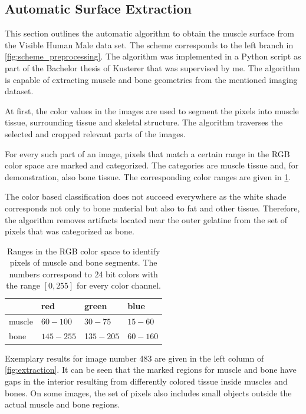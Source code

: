 \subsection{Automatic Surface Extraction}
This section outlines the automatic algorithm to obtain the muscle surface from the Visible Human Male data set. The scheme corresponds to the left branch in \cref{fig:scheme_preprocessing}. The algorithm was implemented in a Python script as part of the Bachelor thesis of Kusterer \cite{Kusterer} that was supervised by me.
The algorithm is capable of extracting muscle and bone geometries from the mentioned imaging dataset.

At first, the color values in the images are used to segment the pixels into muscle tissue, surrounding tissue and skeletal structure. The algorithm traverses the selected and cropped relevant parts of the images. 

For every such part of an image, pixels that match a certain range in the RGB color space are marked and categorized. The categories are muscle tissue and, for demonstration, also bone tissue. The corresponding color ranges are given in \cref{tab:color_ranges}.

The color based classification does not succeed everywhere as the white shade corresponds not only to bone material but also to fat and other tissue. Therefore, the algorithm removes artifacts located near the outer gelatine from the set of pixels that was categorized as bone. 

\begin{table}
  \centering%
  \begin{tabular}{|l|lll|}
    \hline
    & red & green & blue\\
    \hline
    muscle & $60 - 100$& $30-75$   & $15-60$\\
    bone   & $145-255$ & 1$35-205$ & $60-160$\\
    \hline
  \end{tabular}
  \caption{Ranges in the RGB color space to identify pixels of muscle and bone segments. The numbers correspond to 24 bit colors with the range $[0,255]$ for every color channel.}%
  \label{tab:color_ranges}%
\end{table}

Exemplary results for image number 483 are given in the left column of \cref{fig:extraction}.
It can be seen that the marked regions for muscle and bone have gaps in the interior resulting from differently colored tissue inside muscles and bones. On some images, the set of pixels also includes small objects outside the actual muscle and bone regions.

